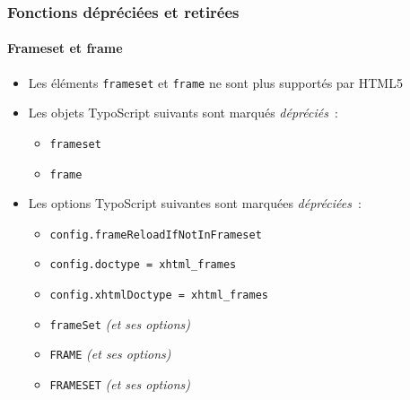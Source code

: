 \begin{frame}[fragile]
	\frametitle{Fonctions dépréciées et retirées}
	\framesubtitle{Frameset et frame}

	\begin{itemize}
		\item Les éléments \texttt{frameset} et \texttt{frame} ne sont plus supportés par HTML5
		\item Les objets TypoScript suivants sont marqués \textit{dépréciés}~:

			\begin{itemize}
				\item \texttt{frameset}
				\item \texttt{frame}
			\end{itemize}

		\item Les options TypoScript suivantes sont marquées \textit{dépréciées}~:

			\begin{itemize}
				\item \texttt{config.frameReloadIfNotInFrameset}
				\item \texttt{config.doctype = xhtml\_frames}
				\item \texttt{config.xhtmlDoctype = xhtml\_frames}
				\item \texttt{frameSet} \tabto{1.8cm}\textit{(et ses options)}
				\item \texttt{FRAME} \tabto{1.8cm}\textit{(et ses options)}
				\item \texttt{FRAMESET} \tabto{1.8cm}\textit{(et ses options)}
			\end{itemize}

	\end{itemize}

\end{frame}





